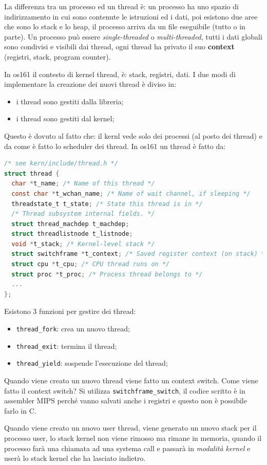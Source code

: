 \documentclass[12pt]{article}
\begin{document}
La differenza tra un processo ed un thread \`e:
un processo ha uno spazio di indirizzamento in cui sono contenute le istruzioni ed i dati, poi esistono due aree che sono lo stack e lo heap, il processo arriva da un file eseguibile (tutto o in parte). Un processo pu\`o essere \emph{single-threaded} o \emph{multi-threaded}, tutti i dati globali sono condivisi e visibili dai thread, ogni thread ha privato il suo \textbf{context} (registri, stack, program counter).

In os161 il contesto di kernel thread, \`e: stack, registri, dati. I due modi di implementare la creazione dei nuovi thread \`e diviso in:
\begin{itemize}
  \item i thread sono gestiti dalla libreria;
  \item i thread sono gestiti dal kernel;
\end{itemize}
Questo \`e dovuto al fatto che: il kernl vede solo dei processi (al posto dei thread) e da come \`e fatto lo scheduler dei thread. In os161 un thread \`e fatto da:
\begin{lstlisting}[language=c]
/* see kern/include/thread.h */
struct thread {
  char *t_name; /* Name of this thread */
  const char *t_wchan_name; /* Name of wait channel, if sleeping */
  threadstate_t t_state; /* State this thread is in */
  /* Thread subsystem internal fields. */
  struct thread_machdep t_machdep;
  struct threadlistnode t_listnode;
  void *t_stack; /* Kernel-level stack */
  struct switchframe *t_context; /* Saved register context (on stack) */
  struct cpu *t_cpu; /* CPU thread runs on */
  struct proc *t_proc; /* Process thread belongs to */
  ...
};
\end{lstlisting}
Esistono 3 funzioni per gestire dei thread:
\begin{itemize}
  \item \texttt{thread\_fork}: crea un nuovo thread;
  \item \texttt{thread\_exit}: termina il thread;
  \item \texttt{thread\_yield}: sospende l'esecuzione del thread;
\end{itemize}
Quando viene creato un nuovo thread viene fatto un context switch. Come viene fatto il context switch? Si utilizza \texttt{switchframe\_switch}, il codice scritto \`e in assembler MIPS perch\'e vanno salvati anche i registri e questo non \`e possibile farlo in C.

Quando viene creato un nuovo user thread, viene generato un nuovo stack per il processo user, lo stack kernel non viene rimosso ma rimane in memoria, quando il processo far\`a una chiamata ad una systema call e passar\`a in \emph{modalit\`a kernel} e user\`a lo stack kernel che ha lasciato indietro.
\end{document}
